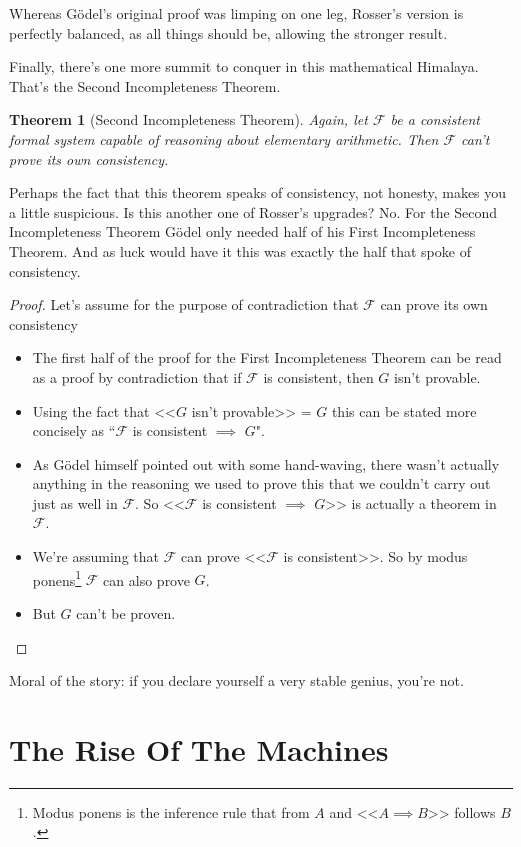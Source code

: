 \documentclass{article}
\theoremstyle{theorem}
\newtheorem{theorem}{Theorem}
\newcommand{\impl}{\item[$\Rightarrow$]}
\begin{document}
Whereas Gödel's original proof was limping on one leg, Rosser's version is perfectly balanced, as all things should be, allowing the stronger result.

Finally, there's one more summit to conquer in this mathematical Himalaya. That's the Second Incompleteness Theorem.

\begin{theorem}[Second Incompleteness Theorem]
Again, let $\mathcal{F}$ be a consistent formal system capable of reasoning about elementary arithmetic. Then $\mathcal{F}$ can't prove its own consistency.
\end{theorem}

Perhaps the fact that this theorem speaks of consistency, not honesty, makes you a little suspicious. Is this another one of Rosser's upgrades? No. For the Second Incompleteness Theorem Gödel only needed half of his First Incompleteness Theorem. And as luck would have it this was exactly the half that spoke of consistency.

\begin{proof}
Let's assume for the purpose of contradiction that $\mathcal{F}$ can prove its own consistency
\begin{itemize}
\impl The first half of the proof for the First Incompleteness Theorem can be read as a proof by contradiction that if $\mathcal{F}$ is consistent, then $G$ isn't provable.
\impl Using the fact that <<$G$ isn't provable>> = $G$ this can be stated more concisely as ``$\mathcal{F}$ is consistent $\implies$ $G$".
\impl As Gödel himself pointed out with some hand-waving, there wasn't actually anything in the reasoning we used to prove this that we couldn't carry out just as well in $\mathcal{F}$. So <<$\mathcal{F}$ is consistent $\implies$ $G$>> is actually a theorem in $\mathcal{F}$.
\impl We're assuming that $\mathcal{F}$ can prove <<$\mathcal{F}$ is consistent>>. So by modus ponens\footnote{Modus ponens is the inference rule that from $A$ and <<$A \implies B$>> follows $B$.} $\mathcal{F}$ can also prove $G$.
\impl But $G$ can't be proven. \lightning
\end{itemize}
\end{proof}

Moral of the story: if you declare yourself a very stable genius, you're not.\cite{trump}

\section{The Rise Of The Machines}
\end{document}
